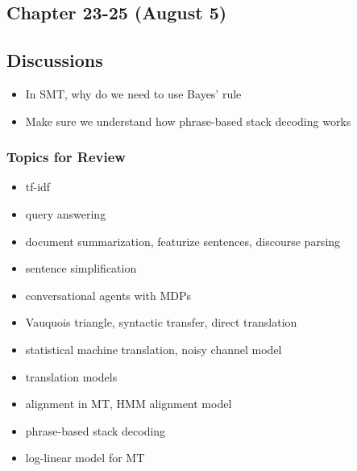 \subsection{Chapter 23-25 (August 5)}
\subsection*{Discussions}
\begin{itemize}
\item In SMT, why do we need to use Bayes' rule
\item Make sure we understand how phrase-based stack decoding works
\end{itemize}

\subsubsection*{Topics for Review}
\begin{itemize}
\item tf-idf
\item query answering
\item document summarization, featurize sentences, discourse parsing
\item sentence simplification
\item conversational agents with MDPs
\item Vauquois triangle, syntactic transfer, direct translation
\item statistical machine translation, noisy channel model
\item translation models
\item alignment in MT, HMM alignment model
\item phrase-based stack decoding
\item log-linear model for MT
\end{itemize}

